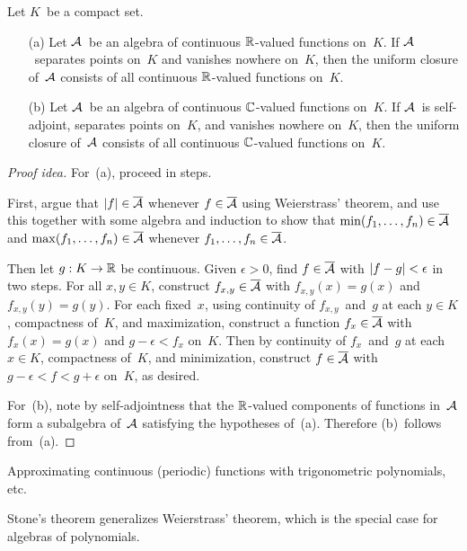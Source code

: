 \begin{thm}[Stone]
Let \(K\)~be a compact set.
\begin{enumerate}[itemsep=0pt]
\item[(a)] Let \(\mathcal{A}\)~be an algebra of continuous \(\mathbb{R}\)-valued functions on~\(K\). If \(\mathcal{A}\)~separates points on~\(K\) and vanishes nowhere on~\(K\), then the uniform closure of~\(\mathcal{A}\) consists of all continuous \(\mathbb{R}\)-valued functions on~\(K\).
\item[(b)] Let \(\mathcal{A}\)~be an algebra of continuous \(\mathbb{C}\)-valued functions on~\(K\). If \(\mathcal{A}\)~is self-adjoint, separates points on~\(K\), and vanishes nowhere on~\(K\), then the uniform closure of~\(\mathcal{A}\) consists of all continuous \(\mathbb{C}\)-valued functions on~\(K\).
\end{enumerate}
\end{thm}
\begin{proof}[Proof idea]
For~(a), proceed in steps.

First, argue that \(|{f}|\in\overline{\mathcal{A}}\) whenever \(f\in\overline{\mathcal{A}}\) using Weierstrass' theorem, and use this together with some algebra and induction to show that \(\min(f_1,\ldots,f_n)\in\overline{\mathcal{A}}\) and \(\max(f_1,\ldots,f_n)\in\overline{\mathcal{A}}\) whenever \(f_1,\ldots,f_n\in\overline{\mathcal{A}}\).

Then let \(g:K\to\mathbb{R}\) be continuous. Given \(\epsilon>0\), find \(f\in\overline{\mathcal{A}}\) with \(|{f-g}|<\epsilon\) in two steps. For all \(x,y\in K\), construct \(f_{x,y}\in\overline{\mathcal{A}}\) with \(f_{x,y}(x)=g(x)\) and \(f_{x,y}(y)=g(y)\). For each fixed~\(x\), using continuity of \(f_{x,y}\)~and~\(g\) at each \(y\in K\), compactness of~\(K\), and maximization, construct a function \(f_x\in\overline{\mathcal{A}}\) with \(f_x(x)=g(x)\) and \(g-\epsilon<f_x\) on~\(K\). Then by continuity of \(f_x\)~and~\(g\) at each \(x\in K\), compactness of~\(K\), and minimization, construct \(f\in\overline{\mathcal{A}}\) with \(g-\epsilon<f<g+\epsilon\) on~\(K\), as desired.

For~(b), note by self-adjointness that the \(\mathbb{R}\)-valued components of functions in~\(\mathcal{A}\) form a subalgebra of~\(\mathcal{A}\) satisfying the hypotheses of~(a). Therefore (b)~follows from~(a).
\end{proof}
\begin{app}
Approximating continuous (periodic) functions with trigonometric polynomials, etc.
\end{app}
\begin{rmk}
Stone's theorem generalizes Weierstrass' theorem, which is the special case for algebras of polynomials.
\end{rmk}

